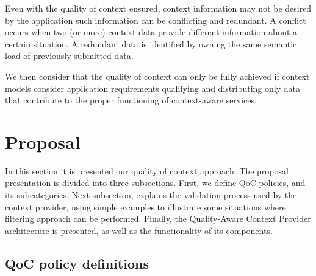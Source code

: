 \documentclass[letterpaper,conference]{IEEEtran}
\begin{document}
 Even with the quality of context ensured, context information may not be desired by 
 the application such information can be conflicting and redundant. A conflict occurs
 when two (or more) context data provide different information about a certain situation.
 A redundant data is identified by owning the same semantic load of previously submitted
 data.
%  
%  
%   
%   
 
  We then consider that the quality of context can only be fully achieved if context 
  models consider application requirements qualifying and distributing only data that 
  contribute to the proper functioning of context-aware services.

\section{Proposal}

 In this section it is presented our quality of context approach. The proposal 
 presentation is divided into three subsections. First, we define QoC policies, 
 and its subcategories. Next subsection, explains the validation process used by 
 the context provider, using simple examples to illustrate some situations where 
 filtering approach can be performed. Finally, the Quality-Aware Context Provider 
 architecture is presented, as well as the functionality of its components.

\subsection{QoC policy definitions}
\end{document}
